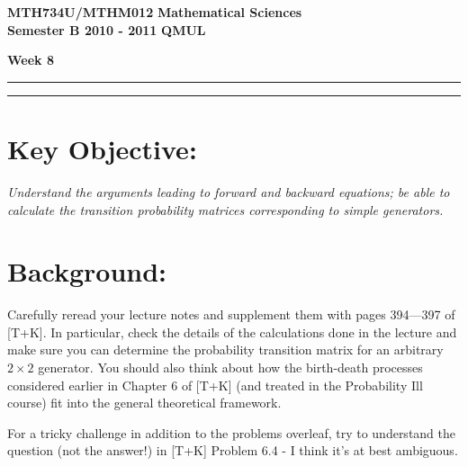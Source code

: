 \documentclass[11pt,a4paper]{article}
\begin{document}
  \textbf{MTH734U/MTHM012} \hfill \textbf{Mathematical Sciences}\\
  \textbf{Semester B 2010 - 2011} \hfill \textbf{QMUL}
  \begin{center}
    \textbf{\huge Week 8}
  \end{center}
  \hrule \vspace{2mm} \hrule

  \section*{Key Objective:}
  \textit{Understand the arguments leading to forward and backward equations; be able to calculate the transition probability matrices corresponding to simple generators.}

  \section*{Background:}
  Carefully reread your lecture notes and supplement them with pages 394—397 of [T+K]. In particular, check the details of the calculations done in the lecture and make sure you can determine the probability transition matrix for an arbitrary $2\times 2$ generator. You should also think about how the birth-death processes considered earlier in Chapter 6 of [T+K] (and treated in the Probability Ill course) fit into the general theoretical framework.\par
  For a tricky challenge in addition to the problems overleaf, try to understand the question (not the answer!) in [T+K] Problem 6.4 - I think it's at best ambiguous.

  \newpage
\end{document}
